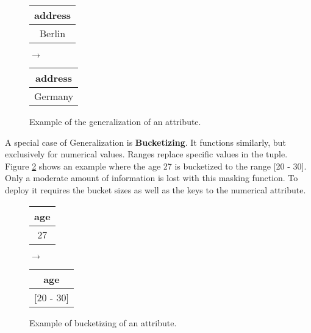 \bigskip

\begin{figure}[ht]
    \begin{center}
    \footnotesize{
        \renewcommand{\arraystretch}{1.5}
        \begin{tabular}{|c|}
            \hline
            address \\
            \hline
            Berlin \\
            \hline
            \end{tabular}
            \quad $\longrightarrow$ \quad
            \begin{tabular}{|c|}
            \hline
            address \\
            \hline
            Germany \\
            \hline
        \end{tabular}
    }
    \end{center}
    \caption{Example of the generalization of an attribute.\label{fig:generalization}}
\end{figure}

A special case of Generalization is \textbf{Bucketizing}. It functions similarly, but exclusively for numerical values. Ranges replace specific values in the tuple. Figure \ref{fig:bucketizing} shows an example where the age 27 is bucketized to the range {[20 - 30]}. Only a moderate amount of information is lost with this masking function. To deploy it requires the bucket sizes as well as the keys to the numerical attribute. 

\bigskip

\begin{figure}[ht]
    \begin{center}
    \footnotesize{
        \renewcommand{\arraystretch}{1.5}
        \begin{tabular}{|c|}
            \hline
            age \\
            \hline
            27 \\
            \hline
            \end{tabular}
            \quad $\longrightarrow$ \quad
            \begin{tabular}{|c|}
            \hline
            age \\
            \hline
            {[20 - 30]} \\
            \hline
        \end{tabular}
    }
    \end{center}
    \caption{Example of bucketizing of an attribute.\label{fig:bucketizing}}
\end{figure}

